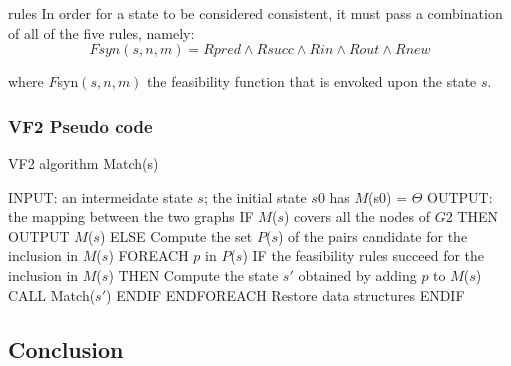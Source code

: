 {rules}
\newpage
In order for a state to be considered consistent, it must pass a combination of all of the five rules, namely:
	\begin{equation}
		Fsyn(s,n,m) = Rpred \wedge Rsucc \wedge Rin \wedge Rout \wedge Rnew 
	\end{equation} 

where $F${\tiny syn}$(s,n,m)$ the feasibility function that is envoked upon the state $s$.

\subsubsection{VF2 Pseudo code}
	\begin{algorithm}[H]
	    \caption{VF2 algorithm Match(s)}
	    \begin{algorithmic}[1]
		\State INPUT: an intermeidate state $s$; the initial state $s${\tiny 0} has $M$(s{\tiny 0}) = $\Theta$ \newline
		\State OUTPUT: the mapping between the two graphs \newline\newline
		\State IF $M$($s$) covers all the nodes of $G${\tiny 2} THEN\newline
		       OUTPUT $M$($s$) \newline
		\State ELSE \newline
		       Compute the set $P$($s$) of the pairs candidate for the inclusion in $M$($s$)\newline
		\State FOREACH $p$ in $P$($s$)\newline
		\State IF the feasibility rules succeed for the inclusion in $M$($s$) THEN\newline
		       Compute the state $s'$ obtained by adding $p$ to $M$($s$)\newline
		       CALL Match($s'$)\newline
		       ENDIF\newline
		       ENDFOREACH\newline
		       Restore data structures\newline
		       ENDIF
	    \end{algorithmic}
	\end{algorithm}

 \subsection{Conclusion}

